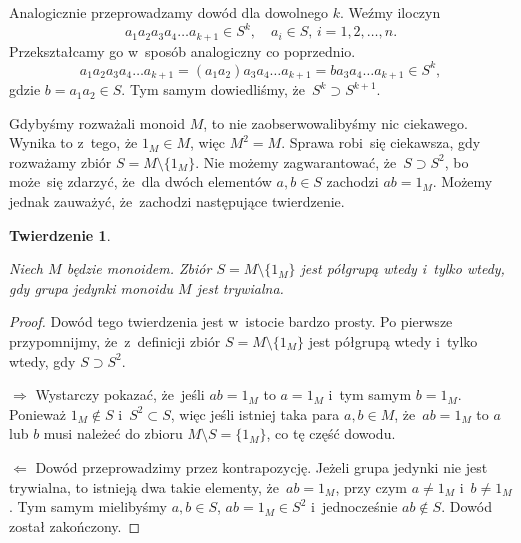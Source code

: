 \documentclass[a4paper,11pt]{article}
\newtheorem{theorem}{Twierdzenie}  %
\begin{document}
Analogicznie przeprowadzamy dowód dla dowolnego $k$. Weźmy iloczyn
\begin{equation}
  \label{eq:5}
  a_{ 1 } a_{ 2 } a_{ 3 } a_{ 4 } \ldots a_{ k + 1 } \in S^{ k }, \quad
  a_{ i } \in S,\, i = 1, 2, \ldots, n.
\end{equation}
Przekształcamy go w~sposób analogiczny co poprzednio.
\begin{equation}
  \label{eq:6}
  a_{ 1 } a_{ 2 } a_{ 3 } a_{ 4 } \ldots a_{ k + 1 } =
  ( a_{ 1 } a_{ 2 } ) a_{ 3 } a_{ 4 } \ldots a_{ k + 1 } =
  b a_{ 3 } a_{ 4 } \ldots a_{ k + 1 } \in S^{ k },
\end{equation}
gdzie $b = a_{ 1 } a_{ 2 } \in S$. Tym samym dowiedliśmy,
że~$S^{ k } \supset S^{ k + 1 }$.

Gdybyśmy rozważali monoid $M$, to nie zaobserwowalibyśmy nic ciekawego.
Wynika to z~tego, że $1_{ M } \in M$, więc $M^{ 2 } = M$. Sprawa robi~się ciekawsza, gdy rozważamy zbiór $S = M \setminus \{ 1_{ M } \}$. Nie możemy zagwarantować, że~$S \supset S^{ 2 }$, bo może~się zdarzyć, że~dla dwóch elementów $a, b \in S$ zachodzi $a b = 1_{ M }$. Możemy jednak zauważyć, że~zachodzi następujące twierdzenie.





\begin{theorem}
  \label{thm:Forys-Forys-01}

  Niech $M$ będzie monoidem. Zbiór $S = M \setminus \{ 1_{ M } \}$ jest półgrupą wtedy
  i~tylko wtedy, gdy grupa jedynki monoidu $M$ jest trywialna.

\end{theorem}



\begin{proof}

  Dowód tego twierdzenia jest w~istocie bardzo prosty. Po pierwsze
  przypomnijmy, że~z~definicji zbiór $S = M \setminus \{ 1_{ M } \}$ jest półgrupą
  wtedy i~tylko wtedy, gdy $S \supset S^{ 2 }$.

  $\Rightarrow$ Wystarczy pokazać, że~jeśli $a b = 1_{ M }$ to $a = 1_{ M }$ i~tym
  samym $b = 1_{ M }$. Ponieważ $1_{ M } \notin S$ i~$S^{ 2 } \subset S$, więc jeśli
  istniej taka para $a, b \in M$, że~$ab = 1_{ M }$ to $a$ lub $b$ musi
  należeć do zbioru $M \setminus S = \{ 1_{ M } \}$, co tę część dowodu.

  $\Leftarrow$ Dowód przeprowadzimy przez kontrapozycję. Jeżeli grupa jedynki nie
  jest trywialna, to istnieją dwa takie elementy, że~$a b = 1_{ M }$, przy
  czym $a \neq 1_{ M }$ i~$b \neq 1_{ M }$. Tym samym mielibyśmy $a, b \in S$,
  $ab = 1_{ M } \in S^{ 2 }$ i~jednocześnie $ab \notin S$. Dowód został zakończony.

\end{proof}
\end{document}
